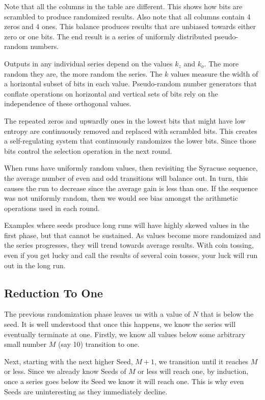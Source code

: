 \documentclass[letterpaper]{article}
\begin{document}
\begin{multicols}{2}
    Note that all the columns in the table are different. This shows how bits are scrambled to produce randomized results. Also note that all columns contain 4 zeros and 4 ones. This balance produces results that are unbiased towards either zero or one bits. The end result is a series of uniformly distributed pseudo-random numbers.

    Outputs in any individual series depend on the values $k_z$ and $k_o$. The more random they are, the more random the series. The $k$ values measure the width of a horizontal subset of bits in each value. Pseudo-random number generators that conflate operations on horizontal and vertical sets of bits rely on the independence of these orthogonal values.

    The repeated zeros and upwardly ones in the lowest bits that might have low entropy are continuously removed and replaced with scrambled bits. This creates a self-regulating system that continuously randomizes the lower bits. Since those bits control the selection operation in the next round.

    When runs have uniformly random values, then revisiting the Syracuse sequence, the average number of even and odd transitions will balance out. In turn, this causes the run to decrease since the average gain is less than one. If the sequence was not uniformly random, then we would see bias amongst the arithmetic operations used in each round.

    Examples where seeds produce long runs will have highly skewed values in the first phase, but that cannot be sustained. As values become more randomized and the series progresses, they will trend towards average results. With coin tossing, even if you get lucky and call the results of several coin tosses, your luck will run out in the long run.

    \subsection{Reduction To One}

    The previous randomization phase leaves us with a value of \( N \) that is below the seed. It is well understood that once this happens, we know the series will eventually terminate at one. Firstly, we know all values below some arbitrary small number \( M \) (say 10) transition to one.

    Next, starting with the next higher Seed, \( M + 1 \), we transition until it reaches \( M \) or less. Since we already know Seeds of \( M \) or less will reach one, by induction, once a series goes below its Seed we know it will reach one. This is why even Seeds are uninteresting as they immediately decline.


\end{multicols}
\end{document}
